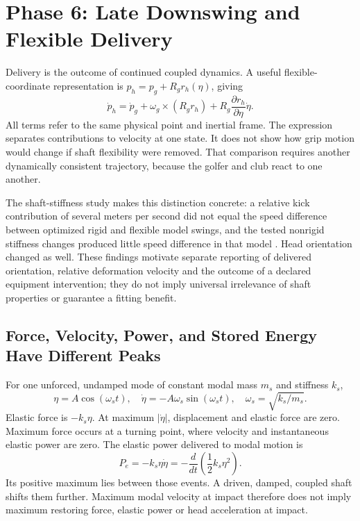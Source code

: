 \section{Phase 6: Late Downswing and Flexible Delivery}

Delivery is the outcome of continued coupled dynamics. A useful flexible-coordinate representation is $p_h=p_g+R_g r_h(\eta)$, giving
\begin{equation}
\dot p_h=\dot p_g+\omega_g\times(R_g r_h)
       +R_g\frac{\partial r_h}{\partial\eta}\dot\eta.
\label{eq:complete_head_velocity}
\end{equation}
All terms refer to the same physical point and inertial frame. The expression separates contributions to velocity at one state. It does not show how grip motion would change if shaft flexibility were removed. That comparison requires another dynamically consistent trajectory, because the golfer and club react to one another.

The shaft-stiffness study makes this distinction concrete: a relative kick contribution of several meters per second did not equal the speed difference between optimized rigid and flexible model swings, and the tested nonrigid stiffness changes produced little speed difference in that model \citep{MacKenzie2009Stiffness}. Head orientation changed as well. These findings motivate separate reporting of delivered orientation, relative deformation velocity and the outcome of a declared equipment intervention; they do not imply universal irrelevance of shaft properties or guarantee a fitting benefit.

\subsection{Force, Velocity, Power, and Stored Energy Have Different Peaks}

For one unforced, undamped mode of constant modal mass $m_s$ and stiffness $k_s$,
\begin{equation}
\eta=A\cos(\omega_s t),\quad
\dot\eta=-A\omega_s\sin(\omega_s t),\quad
\omega_s=\sqrt{k_s/m_s}.
\label{eq:complete_mode}
\end{equation}
Elastic force is $-k_s\eta$. At maximum $|\dot\eta|$, displacement and elastic force are zero. Maximum force occurs at a turning point, where velocity and instantaneous elastic power are zero. The elastic power delivered to modal motion is
\begin{equation}
P_e=-k_s\eta\dot\eta
   =-\frac{d}{dt}\left(\frac12k_s\eta^2\right).
\label{eq:complete_modal_power}
\end{equation}
Its positive maximum lies between those events. A driven, damped, coupled shaft shifts them further. Maximum modal velocity at impact therefore does not imply maximum restoring force, elastic power or head acceleration at impact.

